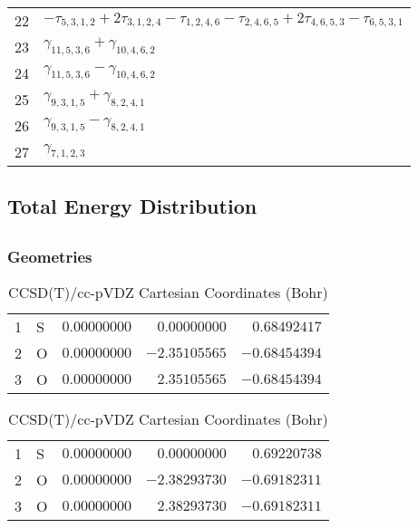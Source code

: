 \documentclass[10pt,oneside]{article}
\begin{document}
\begin{table}[h!]
\begin{tabular}{ll}
  22  & $-\tau_{5,3,1,2} + 2\tau_{3,1,2,4} - \tau_{1,2,4,6} - \tau_{2,4,6,5} + 2\tau_{4,6,5,3} - \tau_{6,5,3,1}$ \\
  23  & $\gamma_{11,5,3,6} + \gamma_{10,4,6,2}$ \\
  24  & $\gamma_{11,5,3,6} - \gamma_{10,4,6,2}$ \\
  25  & $\gamma_{9,3,1,5} + \gamma_{8,2,4,1}$ \\
  26  & $\gamma_{9,3,1,5} - \gamma_{8,2,4,1}$ \\
  27  & $\gamma_{7,1,2,3}$ \\
\bottomrule
\end{tabular}
\end{table}

\begin{table}
\subsection*{Total Energy Distribution}
\centering\end{table}

\clearpage

\subsection{}

\begin{table}[h!]
\subsubsection*{Geometries}
\begin{multicols}{2}
\centering
\caption{CCSD(T)/cc-pVTZ Cartesian Coordinates (Bohr)}
\begin{tabular}{llrrr}
\toprule
1  & S  & $ 0.00000000$ & $ 0.00000000$ & $ 0.68492417$ \\
2  & O  & $ 0.00000000$ & $-2.35105565$ & $-0.68454394$ \\
3  & O  & $ 0.00000000$ & $ 2.35105565$ & $-0.68454394$ \\
\bottomrule
\end{tabular}
\caption{CCSD(T)/cc-pVDZ Cartesian Coordinates (Bohr)}
\begin{tabular}{llrrr}
\toprule
1  & S  & $ 0.00000000$ & $ 0.00000000$ & $ 0.69220738$ \\
2  & O  & $ 0.00000000$ & $-2.38293730$ & $-0.69182311$ \\
3  & O  & $ 0.00000000$ & $ 2.38293730$ & $-0.69182311$ \\
\bottomrule
\end{tabular}
\end{multicols}
\end{table}
\end{document}
